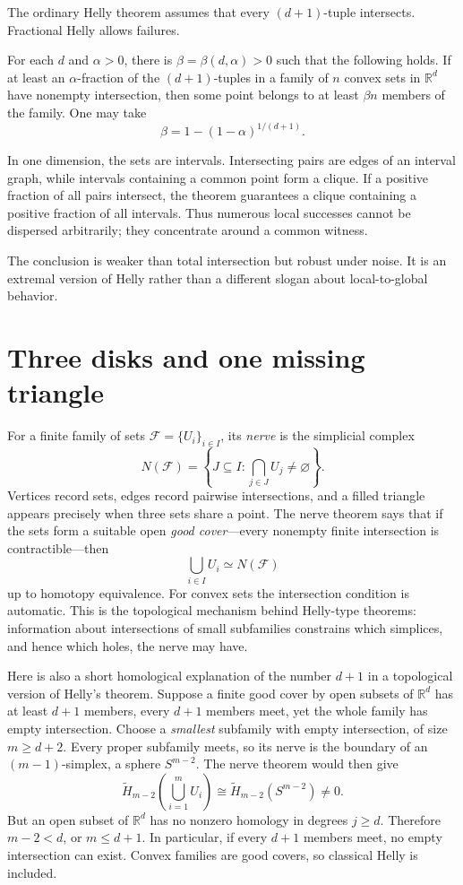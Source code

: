 The ordinary Helly theorem assumes that every \((d+1)\)-tuple intersects.  Fractional Helly allows failures.

For each \(d\) and \(\alpha>0\), there is \(\beta=\beta(d,\alpha)>0\) such that the following holds.  If at least an \(\alpha\)-fraction of the \((d+1)\)-tuples in a family of \(n\) convex sets in \(\mathbb R^d\) have nonempty intersection, then some point belongs to at least \(\beta n\) members of the family.  One may take
\[
  \beta
  =1-(1-\alpha)^{1/(d+1)}.
\]

In one dimension, the sets are intervals.  Intersecting pairs are edges of an interval graph, while intervals containing a common point form a clique.  If a positive fraction of all pairs intersect, the theorem guarantees a clique containing a positive fraction of all intervals.  Thus numerous local successes cannot be dispersed arbitrarily; they concentrate around a common witness.

The conclusion is weaker than total intersection but robust under noise.  It is an extremal version of Helly rather than a different slogan about local-to-global behavior.

\section{Three disks and one missing triangle}

For a finite family of sets $\mathcal F=\{U_i\}_{i\in I}$, its \emph{nerve} is the simplicial complex
\[
 N(\mathcal F)=
 \left\{J\subseteq I:\bigcap_{j\in J}U_j\ne\varnothing\right\}.
\]
Vertices record sets, edges record pairwise intersections, and a filled triangle appears precisely when three sets share a point. The nerve theorem says that if the sets form a suitable open \emph{good cover}---every nonempty finite intersection is contractible---then
\[
 \boxed{\bigcup_{i\in I}U_i\simeq N(\mathcal F)}
\]
up to homotopy equivalence. For convex sets the intersection condition is automatic. This is the topological mechanism behind Helly-type theorems: information about intersections of small subfamilies constrains which simplices, and hence which holes, the nerve may have.

Here is also a short homological explanation of the number $d+1$ in a topological version of Helly's theorem. Suppose a finite good cover by open subsets of $\mathbb R^d$ has at least $d+1$ members, every $d+1$ members meet, yet the whole family has empty intersection. Choose a \emph{smallest} subfamily with empty intersection, of size $m\ge d+2$. Every proper subfamily meets, so its nerve is the boundary of an $(m-1)$-simplex, a sphere $S^{m-2}$. The nerve theorem would then give
\[
 \widetilde H_{m-2}\!\left(\bigcup_{i=1}^mU_i\right)
 \cong\widetilde H_{m-2}(S^{m-2})\ne0.
\]
But an open subset of $\mathbb R^d$ has no nonzero homology in degrees $j\ge d$. Therefore $m-2<d$, or $m\le d+1$. In particular, if every $d+1$ members meet, no empty intersection can exist. Convex families are good covers, so classical Helly is included.

